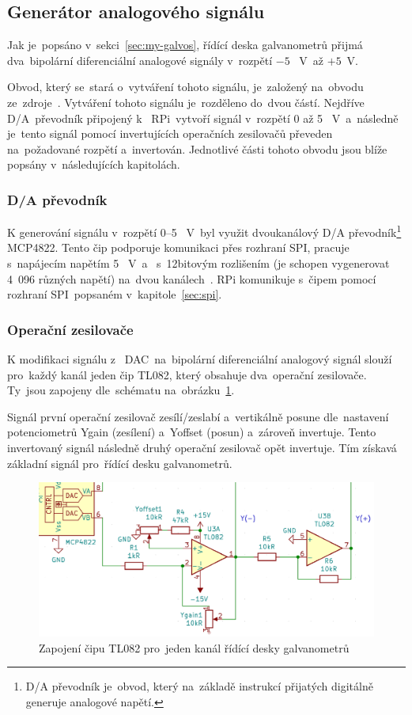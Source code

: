 \subsection{Generátor analogového signálu}\label{sec:ilda-signal-gen}
Jak je~popsáno v~sekci~\ref{sec:my-galvos}, řídící deska galvanometrů přijmá  dva~bipolární diferenciální analogové signály v~rozpětí $-5$ ~V~až $+5$~V.

Obvod, který se~stará o~vytváření tohoto signálu, je~založený na~obvodu ze~zdroje~\cite{lasershow-with-real-galvos}.
Vytváření tohoto signálu je~rozděleno do~dvou částí. Nejdříve D/A~převodník připojený k ~RPi~vytvoří signál v~rozpětí 0 až 5 ~V~a~následně je~tento signál pomocí invertujících operačních zesilovačů převeden na~požadované rozpětí  a~invertován.
Jednotlivé části tohoto obvodu jsou blíže popsány v~následujících kapitolách.

\subsubsection{D/A převodník}
K generování signálu v~rozpětí 0--5 ~V~byl využit dvoukanálový D/A převodník\footnote{D/A převodník je~obvod, který na~základě instrukcí přijatých digitálně generuje analogové napětí.} MCP4822.
Tento čip podporuje komunikaci přes rozhraní SPI, pracuje s~napájecím napětím 5 ~V~a ~s~12bitovým rozlišením (je schopen vygenerovat 4~096 různých napětí) na~dvou kanálech~\cite{mcp4822-dsh}.
RPi komunikuje s~čipem pomocí rozhraní  SPI~popsaném  v~kapitole~\ref{sec:spi}.

\subsubsection{Operační zesilovače~\cite{tl082-dsh}}
K modifikaci signálu z ~DAC~na~bipolární diferenciální analogový signál slouží  pro~každý kanál jeden čip TL082, který obsahuje  dva~operační zesilovače. Ty~jsou zapojeny  dle~schématu na~obrázku~\ref{fig:ilda_amps-scheme}.

Signál první operační zesilovač zesílí/zeslabí a~vertikálně posune  dle~nastavení potenciometrů Ygain (zesílení) a~Yoffset (posun) a~zároveň invertuje. Tento invertovaný signál následně druhý operační zesilovač opět invertuje. Tím získavá základní signál  pro~řídící desku galvanometrů.

\begin{figure}[htb]
  \centering
  \includegraphics[width=1\textwidth]{img/ilda_amps.png}
  \caption{\label{fig:ilda_amps-scheme} Zapojení čipu TL082  pro~jeden kanál řídící desky galvanometrů}
\end{figure}

